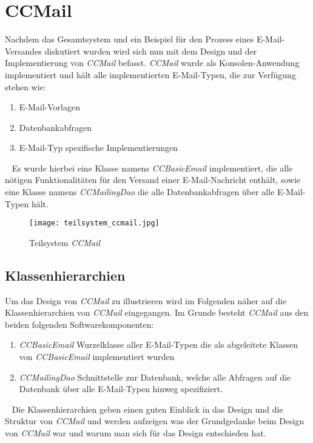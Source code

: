 \chapter{CCMail}
\label{cha:ccmail}
Nachdem das Gesamtsystem und ein Beispiel für den Prozess eines E-Mail-Versandes diskutiert wurden wird sich nun mit dem Design und der Implementierung von \emph{CCMail} befasst. \emph{CCMail} wurde als Konsolen-Anwendung implementiert und hält alle implementierten E-Mail-Typen, die zur Verfügung stehen wie:
\begin{enumerate}
	\item E-Mail-Vorlagen
	\item Datenbankabfragen
	\item E-Mail-Typ spezifische Implementierungen
\end{enumerate}
\ \newline
Es wurde hierbei eine Klasse namens \emph{CCBasicEmail}
implementiert, die alle nötigen Funktionalitäten für den Versand einer E-Mail-Nachricht enthält, sowie eine Klasse namens \emph{CCMailingDao} die alle Datenbankabfragen über alle E-Mail-Typen hält.
\begin{figure}[h]
\centering
\texttt{[image: teilsystem\_ccmail.jpg]} 
\caption{Teilsystem \emph{CCMail}}
\label{fig:class-hierarchie-email}
\end{figure}


\newpage
\section{Klassenhierarchien}
\label{sec:klassen-hierarchien}
Um das Design von \emph{CCMail} zu illustrieren wird im Folgenden näher auf die Klassenhierarchien von \emph{CCMail} eingegangen. Im Grunde besteht \emph{CCMail} aus den beiden folgenden Softwarekomponenten:
\begin{enumerate}
	\item\emph{CCBasicEmail}\newline
	Wurzelklasse aller E-Mail-Typen die als abgeleitete Klassen von \emph{CCBasicEmail} implementiert wurden
	\item\emph{CCMailingDao}\newline
	Schnittstelle zur Datenbank, welche alle Abfragen auf die Datenbank über alle E-Mail-Typen hinweg spezifiziert. 
\end{enumerate}
\ \newline
Die Klassenhierarchien geben einen guten Einblick in das Design und die Struktur von \emph{CCMail} und werden aufzeigen was der Grundgedanke beim Design von \emph{CCMail} war und warum man sich für das Design entschieden hat. 
